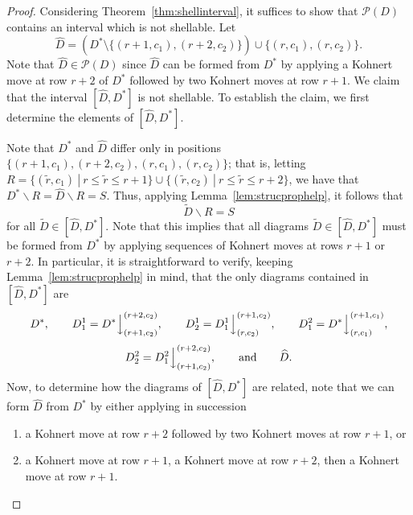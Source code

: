 \documentclass[letterpaper,10pt]{article}
\newcommand{\ldownarrow}{\Big\downarrow}
\begin{document}
\begin{proof}
Considering Theorem~\ref{thm:shellinterval}, it suffices to show that $\mathcal{P}(D)$ contains an interval which is not shellable. Let $$\widehat{D}=\left(D^*\setminus\{(r+1,c_1),(r+2,c_2)\}\right)\cup\{(r,c_1),(r,c_2)\}.$$ Note that $\widehat{D}\in \mathcal{P}(D)$ since $\widehat{D}$ can be formed from $D^*$ by applying a Kohnert move at row $r+2$ of $D^*$ followed by two Kohnert moves at row $r+1$. We claim that the interval $[\widehat{D},D^*]$ is not shellable. To establish the claim, we first determine the elements of $[\widehat{D},D^*]$.

Note that $D^*$ and $\widehat{D}$ differ only in positions $\{(r+1,c_1),(r+2,c_2),(r,c_1),(r,c_2)\}$; that is, letting $R=\{(\tilde{r},c_1)~|~r\le \tilde{r}\le r+1\}\cup \{(\tilde{r},c_2)~|~r\le \tilde{r}\le r+2\}$, we have that $D^*\backslash R=\widehat{D}\backslash R=S$. Thus, applying Lemma~\ref{lem:strucprophelp}, it follows that $$\tilde{D}\backslash R=S$$ for all $\tilde{D}\in [\widehat{D},D^*]$. Note that this implies that all diagrams $\tilde{D}\in [\widehat{D},D^*]$ must be formed from $D^*$ by applying sequences of Kohnert moves at rows $r+1$ or $r+2$. In particular, it is straightforward to verify, keeping Lemma~\ref{lem:strucprophelp} in mind, that the only diagrams contained in $[\widehat{D},D^*]$ are $$D^*,\quad\quad D^1_1=D^*\ldownarrow^{(r+2,c_2)}_{(r+1,c_2)},\quad\quad D^1_2=D^1_1\ldownarrow^{(r+1,c_2)}_{(r,c_2)},\quad\quad D^2_1=D^*\ldownarrow^{(r+1,c_1)}_{(r,c_1)},$$ $$D_2^2=D_1^2\ldownarrow^{(r+2,c_2)}_{(r+1,c_2)},\quad\quad\text{and}\quad\quad \widehat{D}.$$ Now, to determine how the diagrams of $\left[\widehat{D},D^*\right]$ are related, note that we can form $\widehat{D}$ from $D^*$ by either applying in succession
\begin{enumerate}
    \item[1)] a Kohnert move at row $r+2$ followed by two Kohnert moves at row $r+1$, or
    \item[2)] a Kohnert move at row $r+1$, a Kohnert move at row $r+2$, then a Kohnert move at row $r+1$.
\end{enumerate}

\end{proof}
\end{document}

